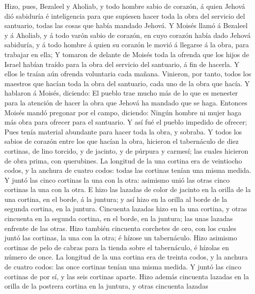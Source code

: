  Hizo, pues, Bezaleel y Aholiab, y todo hombre sabio de
corazón, á quien Jehová dió sabiduría é inteligencia para que supiesen
hacer toda la obra del servicio del santuario, todas las cosas que había
mandado Jehová.  Y Moisés llamó á Bezaleel y á Aholiab, y
á todo varón sabio de corazón, en cuyo corazón había dado Jehová
sabiduría, y á todo hombre á quien su corazón le movió á llegarse á la
obra, para trabajar en ella;  Y tomaron de delante de
Moisés toda la ofrenda que los hijos de Israel habían traído para la
obra del servicio del santuario, á fin de hacerla. Y ellos le traían aún
ofrenda voluntaria cada mañana.  Vinieron, por tanto,
todos los maestros que hacían toda la obra del santuario, cada uno de la
obra que hacía.  Y hablaron á Moisés, diciendo: El pueblo
trae mucho más de lo que es menester para la atención de hacer la obra
que Jehová ha mandado que se haga.  Entonces Moisés mandó
pregonar por el campo, diciendo: Ningún hombre ni mujer haga más obra
para ofrecer para el santuario. Y así fué el pueblo impedido de ofrecer;
 Pues tenía material abundante para hacer toda la obra, y
sobraba.  Y todos los sabios de corazón entre los que
hacían la obra, hicieron el tabernáculo de diez cortinas, de lino
torcido, y de jacinto, y de púrpura y carmesí; las cuales hicieron de
obra prima, con querubines.  La longitud de la una cortina
era de veintiocho codos, y la anchura de cuatro codos: todas las
cortinas tenían una misma medida.  Y juntó las cinco
cortinas la una con la otra: asimismo unió las otras cinco cortinas la
una con la otra.  E hizo las lazadas de color de jacinto
en la orilla de la una cortina, en el borde, á la juntura; y así hizo en
la orilla al borde de la segunda cortina, en la juntura. 
Cincuenta lazadas hizo en la una cortina, y otras cincuenta en la
segunda cortina, en el borde, en la juntura; las unas lazadas enfrente
de las otras.  Hizo también cincuenta corchetes de oro,
con los cuales juntó las cortinas, la una con la otra; é hízose un
tabernáculo.  Hizo asimismo cortinas de pelo de cabras
para la tienda sobre el tabernáculo, é hízolas en número de once.
 La longitud de la una cortina era de treinta codos, y la
anchura de cuatro codos: las once cortinas tenían una misma medida.
 Y juntó las cinco cortinas de por sí, y las seis
cortinas aparte.  Hizo además cincuenta lazadas en la
orilla de la postrera cortina en la juntura, y otras cincuenta lazadas
